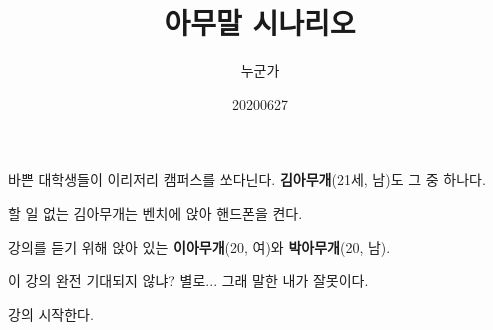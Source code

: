 \documentclass{screenplay-ko}
\title{아무말 시나리오}
\author{누군가}
\date{20200627}
\begin{document}
\maketitle


바쁜 대학생들이 이리저리 캠퍼스를 쏘다닌다. \textbf{김아무개}(21세, 남)도 그 중 하나다.


할 일 없는 김아무개는 벤치에 앉아 핸드폰을 켠다.



강의를 듣기 위해 앉아 있는 \textbf{이아무개}(20, 여)와 \textbf{박아무개}(20, 남).

\begin{dial}
 이 강의 완전 기대되지 않냐?
 별로...
 그래 말한 내가 잘못이다. 
\end{dial}

강의 시작한다.

\theend
\end{document}
